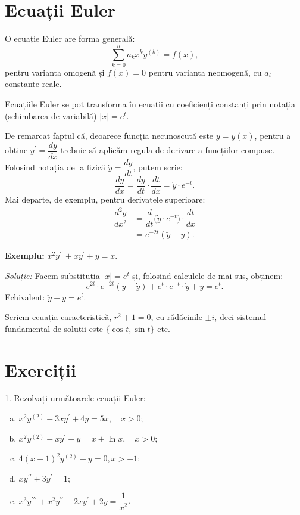 \section{Ecuații Euler}

O ecuație Euler are forma generală:
\[
  \sum_{k = 0}^n a_k x^k y^{(k)} = f(x),
\]
pentru varianta omogenă și $ f(x) = 0 $ pentru varianta neomogenă, cu $ a_i $
constante reale.

Ecuațiile Euler se pot transforma în ecuații cu coeficienți constanți prin notația
(schimbarea de variabilă) $ |x| = e^t $.

De remarcat faptul că, deoarece funcția necunoscută este $ y = y(x) $, pentru
a obține $ y^{\prime} = \dfrac{dy}{dx} $ trebuie să aplicăm regula de derivare
a funcțiilor compuse. Folosind notația de la fizică $ \dot{y} = \dfrac{dy}{dt} $,
putem scrie:
\[
  \dfrac{dy}{dx} = \dfrac{dy}{dt} \cdot \dfrac{dt}{dx} = \dot{y} \cdot e^{-t}.
\]
Mai departe, de exemplu, pentru derivatele superioare:
\begin{align*}
  \dfrac{d^2 y}{dx^2} &= \dfrac{d}{dt} \Big( \dot{y} \cdot e^{-t} \Big) %
  \cdot \dfrac{dt}{dx} \\
                      &= e^{-2t} (\ddot{y} - \dot{y}).
\end{align*}

\vspace{1cm}

\textbf{Exemplu:} $ x^2 y^{\prime\prime} + xy^{\prime} + y = x $.

\emph{Soluție:} Facem substituția $ |x| = e^t $ și, folosind calculele
de mai sus, obținem:
\[
  e^{2t} \cdot e^{-2t} (\ddot{y} - \dot{y}) + e^t \cdot e^{-t} \cdot \dot{y} + y = e^t.
\]
Echivalent: $ \ddot{y} + y = e^t $.

Scriem ecuația caracteristică, $ r^2 + 1 = 0 $, cu rădăcinile $ \pm i $, deci
sistemul fundamental de soluții este $ \{ \cos t, \sin t \} $ etc.



\section{Exerciții}

1. Rezolvați următoarele ecuații Euler:
\begin{enumerate}[(a)]
  \item $ x^2 y^{(2)} - 3xy^{\prime} + 4y = 5x, \quad x > 0 $;
  \item $ x^2 y^{(2)} - xy^{\prime} + y = x + \ln x, \quad x > 0 $;
  \item $ 4(x + 1)^2 y^{(2)} + y = 0, x > -1 $;
  \item $ xy^{\prime\prime} + 3y^{\prime} = 1 $;
  \item $ x^3 y^{\prime\prime\prime} + x^2y^{\prime\prime} - 2xy^{\prime} + 2y = \dfrac{1}{x^2} $.
\end{enumerate}


